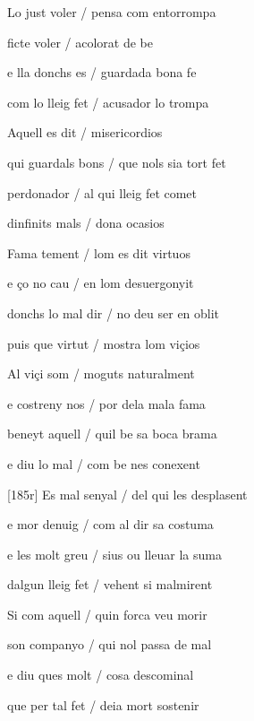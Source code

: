 \documentclass[12pt]{article}
\begin{document}
\begin{estrofa}

 Lo just voler / pensa com entorrompa

 ficte voler / acolorat de be

 e lla donchs es / guardada bona fe

 com lo lleig fet / acusador lo trompa

 Aquell es dit / misericordios

 qui guardals bons / que nols sia tort fet

 perdonador / al qui lleig fet comet

 dinfinits mals / dona ocasios

\end{estrofa}



\begin{estrofa}

 Fama tement / lom es dit virtuos

 e \c{c}o no cau / en lom desuergonyit

 donchs lo mal dir / no deu ser en oblit

 puis que virtut / mostra lom vi\c{c}ios

 Al vi\c{c}i som / moguts naturalment

 e costreny nos / por dela mala fama

 beneyt aquell / quil be sa boca brama

 e diu lo mal / com be nes conexent

\end{estrofa}



\begin{estrofa}

 [185r] Es mal senyal / del qui les desplasent

 e mor denuig / com al dir sa costuma

 e les molt greu / sius ou lleuar la suma

 dalgun lleig fet / vehent si malmirent

 Si com aquell / quin forca veu morir

 son companyo / qui nol passa de mal

 e diu ques molt / cosa descominal

 que per tal fet / deia mort sostenir

\end{estrofa}
\end{document}
